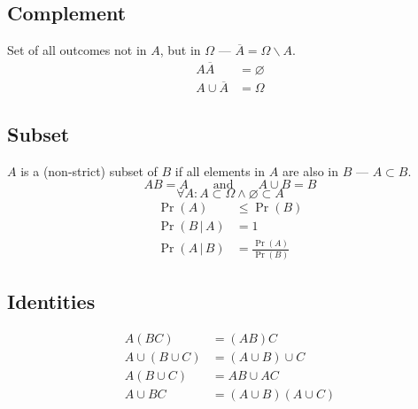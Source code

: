 \documentclass{article}
\begin{document}
\begin{multicols}{3}
    \subsection{Complement}
    Set of all outcomes not in \(A\), but in \(\Omega \) --- \(\overline{A} = \Omega \backslash A\).
    \begin{align*}
        A\overline{A}       & = \varnothing \\
        A \cup \overline{A} & = \Omega
    \end{align*}
    \subsection{Subset}
    \(A\) is a (non-strict) subset of \(B\) if all elements in \(A\) are also in \(B\) --- \(A \subset B\).
    \begin{equation*}
        AB = A \quad\quad \text{and} \quad\quad A \cup B = B
    \end{equation*}
    \begin{equation*}
        \forall A:A\subset \Omega \land \varnothing \subset A
    \end{equation*}
    \begin{align*}
        \Pr{\left( A \right)}             & \leq \Pr{\left( B \right)}                            \\
        \Pr{\left( B \,\vert\, A \right)} & = 1                                                   \\
        \Pr{\left( A \,\vert\, B \right)} & = \frac{\Pr{\left( A \right)}}{\Pr{\left( B \right)}}
    \end{align*}
    \subsection{Identities}
    \begin{align*}
        A \left( BC \right)            & = \left( AB \right) C                             \\
        A \cup \left( B \cup C \right) & = \left( A \cup B \right) \cup C                  \\
        A \left(B \cup C\right)        & = AB \cup AC                                      \\
        A \cup BC                      & = \left( A \cup B \right) \left( A \cup C \right)
    \end{align*}

\end{multicols}
\end{document}
